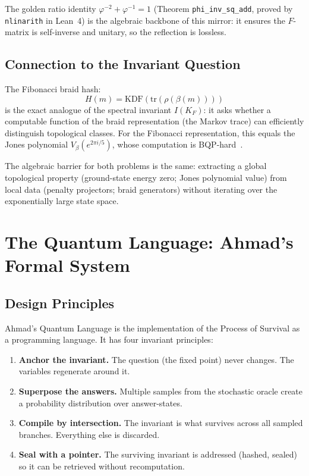 \documentclass[11pt,letterpaper]{article}
\begin{document}
The golden ratio identity $\varphi^{-2} + \varphi^{-1} = 1$ (Theorem
\texttt{phi\_inv\_sq\_add}, proved by \texttt{nlinarith} in Lean~4) is the
algebraic backbone of this mirror: it ensures the $F$-matrix is
self-inverse and unitary, so the reflection is lossless.

\subsection{Connection to the Invariant Question}

The Fibonacci braid hash:
\[
H(m) = \mathrm{KDF}(\mathrm{tr}(\rho(\beta(m))))
\]
is the exact analogue of the spectral invariant $I(K_F)$: it asks whether
a computable function of the braid representation (the Markov trace) can
efficiently distinguish topological classes.  For the Fibonacci representation,
this equals the Jones polynomial $V_\beta(e^{2\pi i/5})$, whose computation
is BQP-hard~\cite{aharonov2009}.

The algebraic barrier for both problems is the same: extracting a global
topological property (ground-state energy zero; Jones polynomial value)
from local data (penalty projectors; braid generators) without iterating
over the exponentially large state space.

\section{The Quantum Language: Ahmad's Formal System}
\label{sec:qal}

\subsection{Design Principles}

Ahmad's Quantum Language is the implementation of the Process of Survival
as a programming language.  It has four invariant principles:

\begin{enumerate}
\item \textbf{Anchor the invariant.}  The question (the fixed point) never
  changes.  The variables regenerate around it.

\item \textbf{Superpose the answers.}  Multiple samples from the stochastic
  oracle create a probability distribution over answer-states.

\item \textbf{Compile by intersection.}  The invariant is what survives
  across all sampled branches.  Everything else is discarded.

\item \textbf{Seal with a pointer.}  The surviving invariant is addressed
  (hashed, sealed) so it can be retrieved without recomputation.
\end{enumerate}
\end{document}
